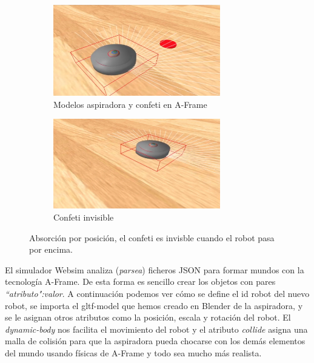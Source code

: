     
\begin{figure}[H]
  \begin{subfigure}[b]{0.5\textwidth}
  \centering
    \includegraphics[width=0.8\textwidth, height=0.5\textwidth]{chapters/images/prototiporoomba.png}
    \caption{Modelos aspiradora y confeti en A-Frame}
    \label{fig:f1}
  \end{subfigure}
  \hfill
  \begin{subfigure}[b]{0.5\textwidth}
  \centering
    \includegraphics[width=0.8\textwidth, height=0.5\textwidth]{chapters/images/prototiporoomba2.png}
	\caption{Confeti invisible}    
    \label{fig:f2}
 
  \end{subfigure}
  \caption{Absorción por posición, el confeti es invisble cuando el robot pasa por encima.}
\end{figure}

El simulador Websim analiza (\textit{parsea}) ficheros JSON para formar mundos con la tecnología A-Frame. De esta forma es sencillo crear los objetos con pares \textit{``atributo":valor}. A continuación podemos ver cómo se define el id robot del nuevo robot, se importa el gltf-model que hemos creado en Blender de la aspiradora, y se le asignan otros atributos como la posición, escala y rotación del robot. El \textit{dynamic-body} nos facilita el movimiento del robot y el atributo \textit{collide} asigna una malla de colisión para que la aspiradora pueda chocarse con los demás elementos del mundo usando físicas de A-Frame y todo sea mucho más realista.

